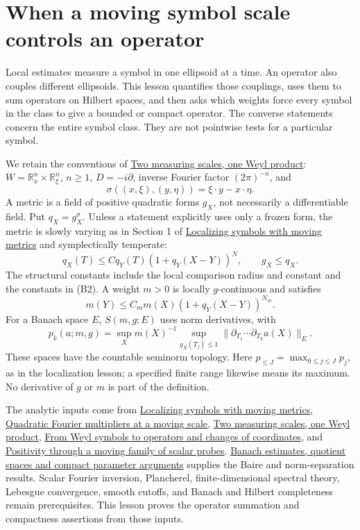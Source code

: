 \documentclass[
  11pt,
]{article}
\author{}
\date{}
\begin{document}
\section{When a moving symbol scale controls an
operator}\label{when-a-moving-symbol-scale-controls-an-operator}

Local estimates measure a symbol in one ellipsoid at a time. An operator
also couples different ellipsoids. This lesson quantifies those
couplings, uses them to sum operators on Hilbert spaces, and then asks
which weights force every symbol in the class to give a bounded or
compact operator. The converse statements concern the entire symbol
class. They are not pointwise tests for a particular symbol.

We retain the conventions of \href{weyl-metric-products.pdf}{Two
measuring scales, one Weyl product}:
\(W=\mathbb R_x^n\times\mathbb R_\xi^n\), \(n\ge1\), \(D=-i\partial\),
inverse Fourier factor \((2\pi)^{-n}\), and \[
 \sigma((x,\xi),(y,\eta))=\xi\cdot y-x\cdot\eta.
 \tag{B1}
\] A metric is a field of positive quadratic forms \(g_X\), not
necessarily a differentiable field. Put \(q_X=g_X^\sigma\). Unless a
statement explicitly uses only a frozen form, the metric is slowly
varying as in Section 1 of \href{metric-localization.pdf}{Localizing
symbols with moving metrics} and symplectically temperate: \[
 q_X(T)\le Cq_Y(T)(1+q_Y(X-Y))^N,
 \qquad g_X\le q_X.
 \tag{B2}
\] The structural constants include the local comparison radius and
constant and the constants in (B2). A weight \(m>0\) is locally
\(g\)-continuous and satisfies \[
 m(Y)\le C_m m(X)(1+q_Y(X-Y))^{N_m}.
 \tag{B3}
\] For a Banach space \(E\), \(S(m,g;E)\) uses norm derivatives, with \[
 p_k(a;m,g)=\sup_X m(X)^{-1}
 \sup_{g_X(T_j)\le1}\|\partial_{T_1}\cdots\partial_{T_k}a(X)\|_E.
 \tag{B4}
\] These spaces have the countable seminorm topology. Here
\(p_{\le J}=\max_{0\le j\le J}p_j\), as in the localization lesson; a
specified finite range likewise means its maximum. No derivative of
\(g\) or \(m\) is part of the definition.

The analytic inputs come from \href{metric-localization.pdf}{Localizing
symbols with moving metrics},
\href{gauss-transform-estimates.pdf}{Quadratic Fourier multipliers at a
moving scale}, \href{weyl-metric-products.pdf}{Two measuring scales, one
Weyl product}, \href{weyl-covariance-action.pdf}{From Weyl symbols to
operators and changes of coordinates}, and
\href{positive-quantization.pdf}{Positivity through a moving family of
scalar probes}. \href{banach-foundation-bridges.pdf}{Banach estimates,
quotient spaces and compact parameter arguments} supplies the Baire and
norm-separation results. Scalar Fourier inversion, Plancherel,
finite-dimensional spectral theory, Lebesgue convergence, smooth
cutoffs, and Banach and Hilbert completeness remain prerequisites. This
lesson proves the operator summation and compactness assertions from
those inputs.
\end{document}

